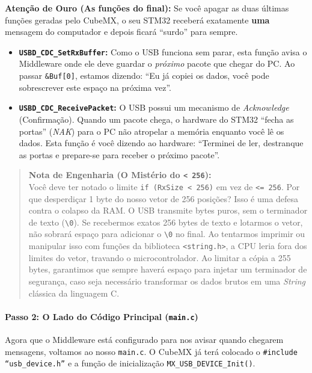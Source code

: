 \documentclass[12pt,a4paper]{article}
\begin{document}
\textbf{Atenção de Ouro (As funções do final):} 
Se você apagar as duas últimas funções geradas pelo CubeMX, o seu STM32 receberá exatamente \textbf{uma} mensagem do computador e depois ficará ``surdo'' para sempre. 
\begin{itemize}
    \item \textbf{\texttt{USBD\_CDC\_SetRxBuffer}:} Como o USB funciona sem parar, esta função avisa o Middleware onde ele deve guardar o \textit{próximo} pacote que chegar do PC. Ao passar \texttt{\&Buf[0]}, estamos dizendo: ``Eu já copiei os dados, você pode sobrescrever este espaço na próxima vez''.
    \item \textbf{\texttt{USBD\_CDC\_ReceivePacket}:} O USB possui um mecanismo de \textit{Acknowledge} (Confirmação). Quando um pacote chega, o hardware do STM32 ``fecha as portas'' (\textit{NAK}) para o PC não atropelar a memória enquanto você lê os dados. Esta função é você dizendo ao hardware: ``Terminei de ler, destranque as portas e prepare-se para receber o próximo pacote''.
\end{itemize}

\begin{quote}
\textbf{Nota de Engenharia (O Mistério do \texttt{< 256}):} \\
Você deve ter notado o limite \texttt{if (RxSize < 256)} em vez de \texttt{<= 256}. Por que desperdiçar 1 byte do nosso vetor de 256 posições? 
Isso é uma defesa contra o colapso da RAM. O USB transmite bytes puros, sem o terminador de texto (\texttt{\textbackslash0}). Se recebermos exatos 256 bytes de texto e lotarmos o vetor, não sobrará espaço para adicionar o \texttt{\textbackslash0} no final. Ao tentarmos imprimir ou manipular isso com funções da biblioteca \texttt{<string.h>}, a CPU leria fora dos limites do vetor, travando o microcontrolador. 
Ao limitar a cópia a 255 bytes, garantimos que sempre haverá espaço para injetar um terminador de segurança, caso seja necessário transformar os dados brutos em uma \textit{String} clássica da linguagem C.
\end{quote}

\paragraph{Passo 2: O Lado do Código Principal (\texttt{main.c})}
Agora que o Middleware está configurado para nos avisar quando chegarem mensagens, voltamos ao nosso \texttt{main.c}. O CubeMX já terá colocado o \texttt{\#include ``usb\_device.h''} e a função de inicialização \texttt{MX\_USB\_DEVICE\_Init()}.
\end{document}
